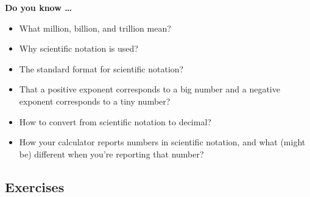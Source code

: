 \noindent \textbf{Do you know \ldots}

\begin{itemize}
\item What million, billion, and trillion mean?  
\item Why scientific notation is used?  
\item The standard format for scientific notation?  
\item That a positive exponent corresponds to a big number and a negative exponent corresponds to a tiny number?
\item How to convert from scientific notation to decimal?  
\item How your calculator reports numbers in scientific notation, and what (might be) different when you're reporting that number?  
  
\end{itemize}

\subsection*{Exercises}

